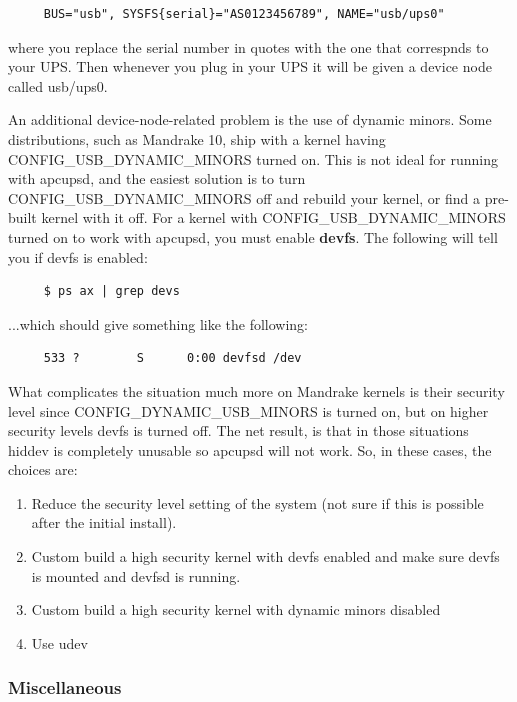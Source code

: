 \begin{verbatim}
     BUS="usb", SYSFS{serial}="AS0123456789", NAME="usb/ups0"
\end{verbatim}

where you replace the serial number in quotes with the one that correspnds to
your UPS. Then whenever you plug in your UPS it will be given a device node
called usb/ups0.

An additional device-node-related problem is the use of dynamic minors. Some
distributions, such as Mandrake 10, ship with a kernel having
CONFIG\_USB\_DYNAMIC\_MINORS turned on. This is not ideal for running with
apcupsd, and the easiest solution is to turn CONFIG\_USB\_DYNAMIC\_MINORS off
and rebuild your kernel, or find a pre-built kernel with it off. For a kernel with
CONFIG\_USB\_DYNAMIC\_MINORS turned on to work with apcupsd, you must enable
{\bf devfs}. The following will tell you if devfs is enabled: 

\begin{verbatim}
     $ ps ax | grep devs
\end{verbatim}

...which should give something like the following: 

\begin{verbatim}
     533 ?        S      0:00 devfsd /dev
\end{verbatim}

What complicates the situation much more on Mandrake kernels is their security
level since CONFIG\_DYNAMIC\_USB\_MINORS is turned on, but on higher security
levels devfs is turned off. The net result, is that in those situations hiddev
is completely unusable so apcupsd will not work. So, in these cases,
the choices are: 

\begin{enumerate}
    \item Reduce the security level setting of the system (not sure if 
    this is possible after the initial install).
    \item Custom build a high security kernel with devfs enabled and make
    sure devfs is mounted and devfsd is running.
    \item Custom build a high security kernel with dynamic minors disabled
    \item Use udev
\end{enumerate}

\subsubsection*{Miscellaneous}

